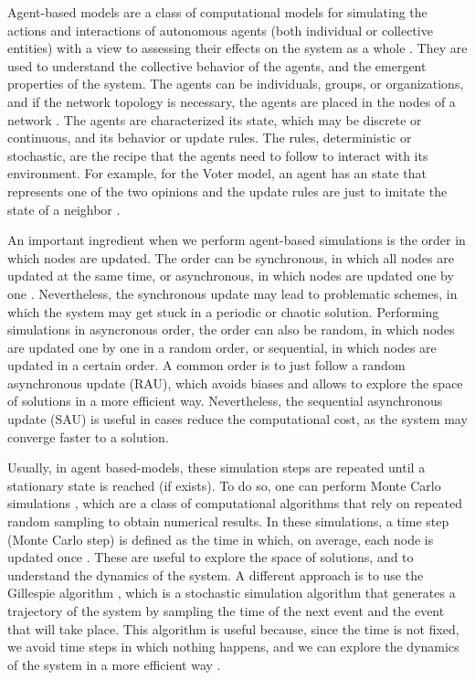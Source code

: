 Agent-based models are a class of computational models for simulating the actions and interactions of autonomous agents (both individual or collective entities) with a view to assessing their effects on the system as a whole \cite{duffy-1998, bonabeau-2002}. They are used to understand the collective behavior of the agents, and the emergent properties of the system. The agents can be individuals, groups, or organizations, and if the network topology is necessary, the agents are placed in the nodes of a network \cite{macal-2010, railsback-2011}. The agents are characterized its state, which may be discrete or continuous, and its behavior or update rules. The rules, deterministic or stochastic, are the recipe that the agents need to follow to interact with its environment. For example, for the Voter model, an agent has an state that represents one of the two opinions and the update rules are just to imitate the state of a neighbor \cite{castellano2009statistical}.

An important ingredient when we perform agent-based simulations is the order in which nodes are updated. The order can be synchronous, in which all nodes are updated at the same time, or asynchronous, in which nodes are updated one by one \cite{macal-2010, railsback-2011}. Nevertheless, the synchronous update may lead to problematic schemes, in which the system may get stuck in a periodic or chaotic solution. Performing simulations in asyncronous order, the order can also be random, in which nodes are updated one by one in a random order, or sequential, in which nodes are updated in a certain order. A common order is to just follow a random asynchronous update (RAU), which avoids biases and allows to explore the space of solutions in a more efficient way. Nevertheless, the sequential asynchronous update (SAU) is useful in cases reduce the computational cost, as the system may converge faster to a solution. 

Usually, in agent based-models, these simulation steps are repeated until a stationary state is reached (if exists). To do so, one can perform Monte Carlo simulations \cite{metropolis-1949}, which are a class of computational algorithms that rely on repeated random sampling to obtain numerical results. In these simulations, a time step (Monte Carlo step) is defined as the time in which, on average, each node is updated once \cite{newman-1999, landau-2014}. These are useful to explore the space of solutions, and to understand the dynamics of the system. A different approach is to use the Gillespie algorithm \cite{gillespie-1977}, which is a stochastic simulation algorithm that generates a trajectory of the system by sampling the time of the next event and the event that will take place. This algorithm is useful because, since the time is not fixed, we avoid time steps in which nothing happens, and we can explore the dynamics of the system in a more efficient way \cite{gibson-2000}.

